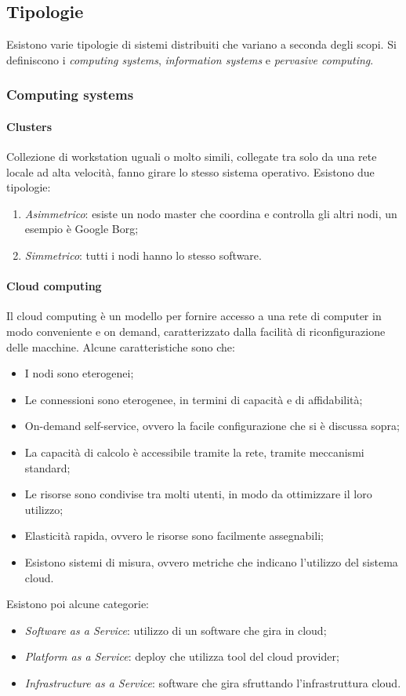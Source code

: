 \subsection{Tipologie}
Esistono varie tipologie di sistemi distribuiti che variano a seconda degli 
scopi. Si definiscono i \emph{computing systems}, \emph{information systems} e \emph{pervasive computing}.

\subsubsection{Computing systems}

\paragraph{Clusters} 
Collezione di workstation uguali o molto simili, 
collegate tra solo da una rete locale ad alta velocità, fanno girare lo 
stesso sistema operativo. Esistono due tipologie:
\begin{enumerate}
    \item \emph{Asimmetrico}: esiste un nodo master che coordina 
    e controlla gli altri nodi, un esempio è Google Borg;
    \item \emph{Simmetrico}: tutti i nodi hanno lo stesso software.
\end{enumerate}

\paragraph{Cloud computing}
Il cloud computing è un modello per fornire accesso a una rete di 
computer in modo conveniente e on demand, caratterizzato dalla 
facilità di riconfigurazione delle macchine.
Alcune caratteristiche sono che:
\begin{itemize}
    \item I nodi sono eterogenei;
    \item Le connessioni sono eterogenee, in termini di capacità e di affidabilità;
    \item On-demand self-service, ovvero la facile configurazione che si è discussa sopra;
    \item La capacità di calcolo è accessibile tramite la rete, tramite meccanismi 
    standard;
    \item Le risorse sono condivise tra molti utenti, in modo da ottimizzare il loro utilizzo;
    \item Elasticità rapida, ovvero le risorse sono facilmente assegnabili;
    \item Esistono sistemi di misura, ovvero metriche che indicano l'utilizzo 
    del sistema cloud.
\end{itemize}
Esistono poi alcune categorie: 
\begin{itemize}
    \item \emph{Software as a Service}: utilizzo di un software che gira in cloud;
    \item \emph{Platform as a Service}: deploy che utilizza tool del cloud provider;
    \item \emph{Infrastructure as a Service}: software che gira sfruttando l'infrastruttura cloud.
\end{itemize}

